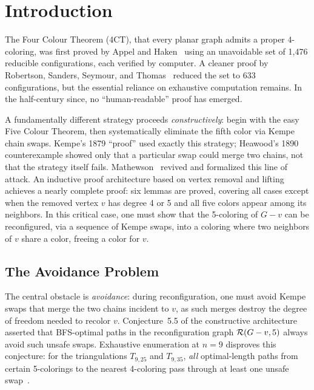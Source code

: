 
\section{Introduction}\label{sec:introduction}

The Four Colour Theorem (4CT), that every planar graph admits a proper
$4$-coloring, was first proved by Appel and Haken~\cite{appel1977}
using an unavoidable set of 1,476 reducible configurations, each
verified by computer. A cleaner proof by Robertson, Sanders, Seymour,
and Thomas~\cite{robertson1997} reduced the set to 633 configurations,
but the essential reliance on exhaustive computation remains. In the
half-century since, no ``human-readable'' proof has emerged.

A fundamentally different strategy proceeds \emph{constructively}: begin
with the easy Five Colour Theorem, then systematically eliminate the
fifth color via Kempe chain swaps. Kempe's 1879 ``proof'' used exactly
this strategy; Heawood's 1890 counterexample showed only that a
particular swap could merge two chains, not that the strategy itself
fails. Mathewson~\cite{mathewson2025constructive} revived and formalized this line of
attack. An inductive proof architecture based on vertex removal and
lifting achieves a nearly complete proof: six lemmas are proved,
covering all cases except when the removed vertex $v$ has degree 4 or 5
and all five colors appear among its neighbors. In this critical case,
one must show that the 5-coloring of $G - v$ can be reconfigured,
via a sequence of Kempe swaps, into a coloring where two neighbors of
$v$ share a color, freeing a color for $v$.

\subsection{The Avoidance Problem}

The central obstacle is \emph{avoidance}: during reconfiguration, one
must avoid Kempe swaps that merge the two chains incident to $v$, as
such merges destroy the degree of freedom needed to recolor $v$.
Conjecture~5.5 of the constructive architecture asserted that
BFS-optimal paths in the reconfiguration graph $\mathcal{R}(G - v, 5)$ always
avoid such unsafe swaps. Exhaustive enumeration at $n = 9$ disproves this
conjecture: for the triangulations $T_{9,25}$ and $T_{9,35}$, \emph{all}
optimal-length paths from certain 5-colorings to the nearest 4-coloring
pass through at least one unsafe swap~\cite{mathewson2025}.

